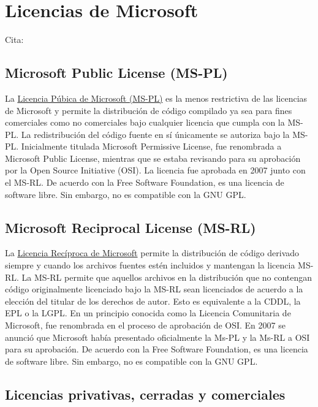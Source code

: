 \section{Licencias de Microsoft}
Cita: \cite{desde_linux_2020}

\subsection{Microsoft Public License (MS-PL)}
La \href{https://opensource.org/licenses/MS-PL}{Licencia Púbica de Microsoft (MS-PL)} es la menos restrictiva de las licencias de Microsoft y permite la distribución de código compilado ya sea para fines comerciales como no comerciales bajo cualquier licencia que cumpla con la MS-PL. La redistribución del código fuente en sí únicamente se autoriza bajo la MS-PL. Inicialmente titulada Microsoft Permissive License, fue renombrada a Microsoft Public License, mientras que se estaba revisando para su aprobación por la Open Source Initiative (OSI). La licencia fue aprobada en 2007 junto con el MS-RL. De acuerdo con la Free Software Foundation, es una licencia de software libre. Sin embargo, no es compatible con la GNU GPL.\cite{wiki_2019:microsoft_public_license_mspl}

\subsection{Microsoft Reciprocal License (MS-RL)}
La \href{https://opensource.org/licenses/MS-RL}{Licencia Recíproca de Microsoft} permite la distribución de código derivado siempre y cuando los archivos fuentes estén incluidos y mantengan la licencia MS-RL. La MS-RL permite que aquellos archivos en la distribución que no contengan código originalmente licenciado bajo la MS-RL sean licenciados de acuerdo a la elección del titular de los derechos de autor. Esto es equivalente a la CDDL, la EPL o la LGPL. En un principio conocida como la Licencia Comunitaria de Microsoft, fue renombrada en el proceso de aprobación de OSI. En 2007 se anunció que Microsoft había presentado oficialmente la Ms-PL y la Ms-RL a OSI para su aprobación.  De acuerdo con la Free Software Foundation, es una licencia de software libre. Sin embargo, no es compatible con la GNU GPL.\cite{wiki_2019:microsoft_reciprocal_license_msrl}

\subsection{Licencias privativas, cerradas y comerciales}
